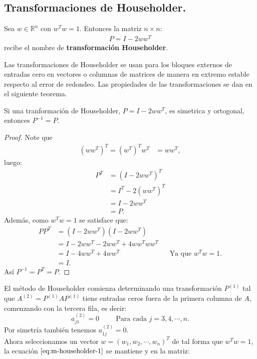 \subsection{Transformaciones de Householder.}
\begin{definition}{}
  Sea $w\in\mathbb{R}^{n}$ con $w^{T}w=1$. Entonces la matriz $n\times n$:
  \begin{align*}
    P=I-2ww^T
  \end{align*}
  recibe el nombre de \textbf{transformación Householder}.
\end{definition}
Las transformaciones de Householder se usan para los bloques externos de entradas cero en vectores o columnas de matrices de manera en extremo estable respecto al error de redondeo. Las propiedades de las transformaciones se dan en el siguiente teorema.
\begin{theorem}{}
  Si una tranformación de Householder, $P=I-2ww^{T}$, es simetrica y ortogonal, entonces $P^{-1}=P$.
\end{theorem}
\begin{proof} 
  Note que
  \begin{align*}
    (ww^{T})^{T}=(w^T)^Tw^T&=ww^T,
  \end{align*}
  luego:
  \begin{align*}
    P^T&=(I-2ww^{T})^T\\
    &=I^{T}-2(ww^{T})^T\\
    &=I-2ww^{T}\\
    &=P.
  \end{align*}
  Además, como $w^{T}w=1$ se satisface que:
  \begin{align*}
    PP^T&=(I-2ww^T)(I-2ww^T)\\
    &=I-2ww^T-2ww^{T}+4ww^Tww^T\\
    &=I-4ww^T+4ww^T &&\text{Ya que $w^Tw=1$.}\\
    &=I.
  \end{align*}
  Así $P^{-1}=P^T=P$.
\end{proof}
El método de Householder comienza determinando una transformación $P^{(1)}$ tal que $A^{(2)}=P^{(1)}AP^{(1)}$ tiene entradas ceros fuera de la primera columna de $A$, comenzando con la tercera fila, es decir:
\begin{equation}\label{eq:m-householder-1}
  a_{j1}^{(2)}=0 \hspace{1cm}\text{Para cada $j=3,4,\cdots,n$.}
\end{equation}
Por simetría también tenemos $a_{1j}^{(2)}=0$.\\
Ahora seleccionamos un vector $w=(w_1,w_2,\cdots,w_n)^{T}$ de tal forma que $w^Tw=1$, la ecuación $\ref{eq:m-householder-1}$ se mantiene y en la matriz:
